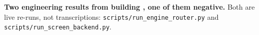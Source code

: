 \begin{table}[t]
\begin{minipage}[t]{0.485\textwidth}\end{minipage}\hfill
\begin{minipage}[t]{0.485\textwidth}\end{minipage}
\caption{\textbf{Two engineering results from building \cd{}, one of them negative.}
Both are live re-runs, not transcriptions: \texttt{scripts/run\_engine\_router.py} and
\texttt{scripts/run\_screen\_backend.py}.}
\label{tab:eng}
\end{table}
